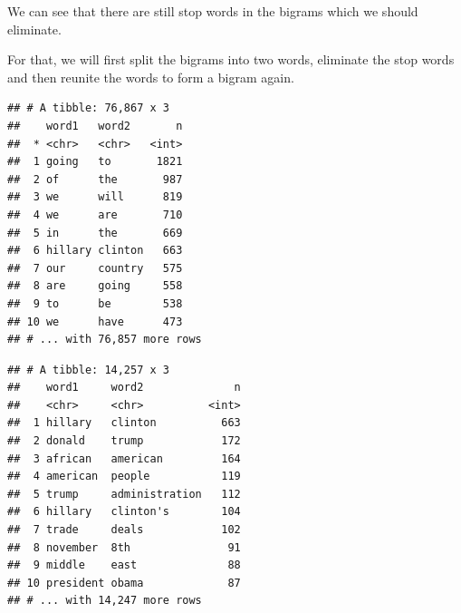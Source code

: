 \documentclass[]{article}
\newenvironment{Shaded}{\begin{snugshade}}{\end{snugshade}}
\newcommand{\KeywordTok}[1]{\textcolor[rgb]{0.13,0.29,0.53}{\textbf{#1}}}
\newcommand{\DataTypeTok}[1]{\textcolor[rgb]{0.13,0.29,0.53}{#1}}
\newcommand{\StringTok}[1]{\textcolor[rgb]{0.31,0.60,0.02}{#1}}
\newcommand{\OperatorTok}[1]{\textcolor[rgb]{0.81,0.36,0.00}{\textbf{#1}}}
\newcommand{\NormalTok}[1]{#1}
\begin{document}
We can see that there are still stop words in the bigrams which we
should eliminate.

For that, we will first split the bigrams into two words, eliminate the
stop words and then reunite the words to form a bigram again.

\begin{Shaded}
\end{Shaded}

\begin{verbatim}
## # A tibble: 76,867 x 3
##    word1   word2       n
##  * <chr>   <chr>   <int>
##  1 going   to       1821
##  2 of      the       987
##  3 we      will      819
##  4 we      are       710
##  5 in      the       669
##  6 hillary clinton   663
##  7 our     country   575
##  8 are     going     558
##  9 to      be        538
## 10 we      have      473
## # ... with 76,857 more rows
\end{verbatim}

\begin{Shaded}
\end{Shaded}

\begin{verbatim}
## # A tibble: 14,257 x 3
##    word1     word2              n
##    <chr>     <chr>          <int>
##  1 hillary   clinton          663
##  2 donald    trump            172
##  3 african   american         164
##  4 american  people           119
##  5 trump     administration   112
##  6 hillary   clinton's        104
##  7 trade     deals            102
##  8 november  8th               91
##  9 middle    east              88
## 10 president obama             87
## # ... with 14,247 more rows
\end{verbatim}
\end{document}

